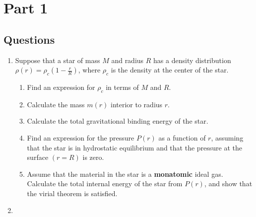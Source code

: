 \section{Part 1}

\subsection{Questions}

\begin{enumerate}[label=1.\arabic*]
    \item Suppose that a star of mass $M$ and radius $R$ has a density distribution $\rho(r) = \rho_c(1 - \frac{r}{R})$,
where $\rho_c$ is the density at the center of the star.
    \begin{enumerate}[label=(\alph*)]
        \item Find an expression for $\rho_c$ in terms of $M$ and $R$.
        \item Calculate the mass $m(r)$ interior to radius $r$.
        \item Calculate the total gravitational binding energy of the star.
        \item Find an expression for the pressure $P(r)$ as a function of $r$, assuming that the star is in hydrostatic equilibrium and that the pressure at the surface $(r = R)$ is zero.
        \item Assume that the material in the star is a \textbf{monatomic} ideal gas. Calculate the total
                internal energy of the star from $P(r)$, and show that the virial theorem is satisfied.
    \end{enumerate}
    \item 
\end{enumerate}